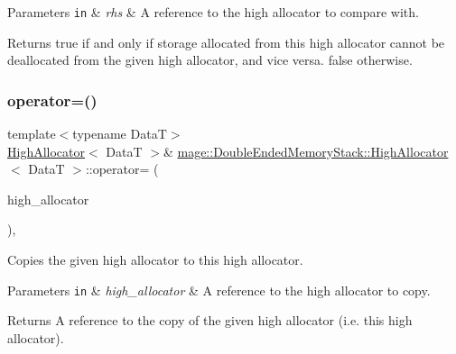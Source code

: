 \begin{DoxyParams}[1]{Parameters}
\mbox{\tt in}  & {\em rhs} & A reference to the high allocator to compare with. \\
\hline
\end{DoxyParams}
\begin{DoxyReturn}{Returns}
{\ttfamily true} if and only if storage allocated from this high allocator cannot be deallocated from the given high allocator, and vice versa. {\ttfamily false} otherwise. 
\end{DoxyReturn}
\hypertarget{structmage_1_1_double_ended_memory_stack_1_1_high_allocator_a98575ee1722ef7a4f1193922bba417f8}{}\label{structmage_1_1_double_ended_memory_stack_1_1_high_allocator_a98575ee1722ef7a4f1193922bba417f8} 
\subsubsection{\texorpdfstring{operator=()}{operator=()}\hspace{0.1cm}{\footnotesize\ttfamily [1/2]}}
{\footnotesize\ttfamily template$<$typename DataT$>$ \\
\hyperlink{structmage_1_1_double_ended_memory_stack_1_1_high_allocator}{High\+Allocator}$<$ DataT $>$\& \hyperlink{structmage_1_1_double_ended_memory_stack_1_1_high_allocator}{mage\+::\+Double\+Ended\+Memory\+Stack\+::\+High\+Allocator}$<$ DataT $>$\+::operator= (\begin{DoxyParamCaption}\item[{const \hyperlink{structmage_1_1_double_ended_memory_stack_1_1_high_allocator}{High\+Allocator}$<$ DataT $>$ \&}]{high\+\_\+allocator }\end{DoxyParamCaption})\hspace{0.3cm}{\ttfamily [delete]}, {\ttfamily [noexcept]}}

Copies the given high allocator to this high allocator.


\begin{DoxyParams}[1]{Parameters}
\mbox{\tt in}  & {\em high\+\_\+allocator} & A reference to the high allocator to copy. \\
\hline
\end{DoxyParams}
\begin{DoxyReturn}{Returns}
A reference to the copy of the given high allocator (i.\+e. this high allocator). 
\end{DoxyReturn}
\hypertarget{structmage_1_1_double_ended_memory_stack_1_1_high_allocator_af4660cee754955e0b5149595c541b1a7}{}\label{structmage_1_1_double_ended_memory_stack_1_1_high_allocator_af4660cee754955e0b5149595c541b1a7} 

